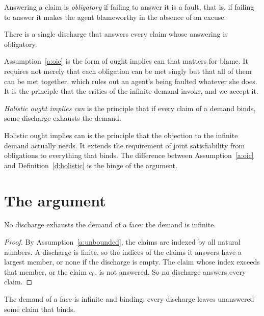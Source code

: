 \documentclass{situationist-preprint}
\begin{document}
\begin{definition}\label{d:obligation}
Answering a claim is \emph{obligatory} if failing to answer it is a fault, that is, if failing to answer it makes the agent blameworthy in the absence of an excuse.
\end{definition}

\begin{assumption}\label{a:oic}
There is a single discharge that answers every claim whose answering is obligatory.
\end{assumption}

Assumption~\ref{a:oic} is the form of ought implies can that matters for blame. It requires not merely that each obligation can be met singly but that all of them can be met together, which rules out an agent's being faulted whatever she does. It is the principle that the critics of the infinite demand invoke, and we accept it.

\begin{definition}\label{d:holistic}
\emph{Holistic ought implies can} is the principle that if every claim of a demand binds, some discharge exhausts the demand.
\end{definition}

Holistic ought implies can is the principle that the objection to the infinite demand actually needs. It extends the requirement of joint satisfiability from obligations to everything that binds. The difference between Assumption~\ref{a:oic} and Definition~\ref{d:holistic} is the hinge of the argument.

\section{The argument}\label{s:argument}

\begin{lemma}\label{l:finite}
No discharge exhausts the demand of a face: the demand is infinite.
\end{lemma}

\begin{proof}
By Assumption~\ref{a:unbounded}, the claims are indexed by all natural numbers. A discharge is finite, so the indices of the claims it answers have a largest member, or none if the discharge is empty. The claim whose index exceeds that member, or the claim $c_0$, is not answered. So no discharge answers every claim.
\end{proof}

\begin{theorem}\label{t:main}
The demand of a face is infinite and binding: every discharge leaves unanswered some claim that binds.
\end{theorem}
\end{document}
